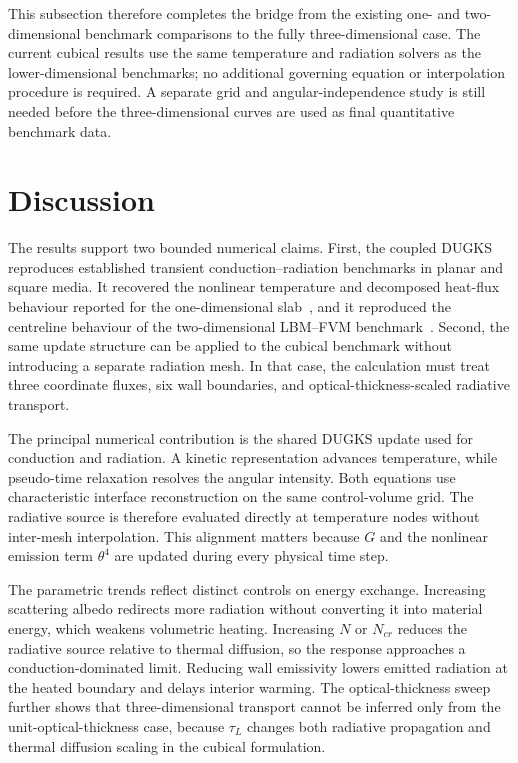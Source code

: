 \documentclass[a4paper,12pt]{ctexart}
\numberwithin{equation}{section}
\newcounter{procedure}
\begin{document}
This subsection therefore completes the bridge from the existing one- and two-dimensional benchmark comparisons to the fully three-dimensional case. The current cubical results use the same temperature and radiation solvers as the lower-dimensional benchmarks; no additional governing equation or interpolation procedure is required. A separate grid and angular-independence study is still needed before the three-dimensional curves are used as final quantitative benchmark data.

\section{Discussion}
\label{sec:discussion}

The results support two bounded numerical claims. First, the coupled DUGKS reproduces established transient conduction--radiation benchmarks in planar and square media. It recovered the nonlinear temperature and decomposed heat-flux behaviour reported for the one-dimensional slab~\cite{Talukdar2001}, and it reproduced the centreline behaviour of the two-dimensional LBM--FVM benchmark~\cite{Sun2016}. Second, the same update structure can be applied to the cubical benchmark without introducing a separate radiation mesh. In that case, the calculation must treat three coordinate fluxes, six wall boundaries, and optical-thickness-scaled radiative transport.

The principal numerical contribution is the shared DUGKS update used for conduction and radiation. A kinetic representation advances temperature, while pseudo-time relaxation resolves the angular intensity. Both equations use characteristic interface reconstruction on the same control-volume grid. The radiative source is therefore evaluated directly at temperature nodes without inter-mesh interpolation. This alignment matters because $G$ and the nonlinear emission term $\theta^4$ are updated during every physical time step.

The parametric trends reflect distinct controls on energy exchange. Increasing scattering albedo redirects more radiation without converting it into material energy, which weakens volumetric heating. Increasing $N$ or $N_{cr}$ reduces the radiative source relative to thermal diffusion, so the response approaches a conduction-dominated limit. Reducing wall emissivity lowers emitted radiation at the heated boundary and delays interior warming. The optical-thickness sweep further shows that three-dimensional transport cannot be inferred only from the unit-optical-thickness case, because $\tau_L$ changes both radiative propagation and thermal diffusion scaling in the cubical formulation.
\end{document}
